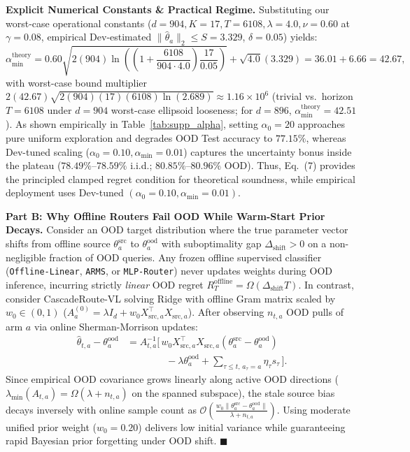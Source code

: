 \documentclass[10pt,twocolumn,letterpaper]{article}
\begin{document}
\textbf{Explicit Numerical Constants \& Practical Regime.} Substituting our worst-case operational constants ($d{=}904, K{=}17, T{=}6108, \lambda{=}4.0, \nu{=}0.60$ at $\gamma{=}0.08$, empirical Dev-estimated $\|\hat{\theta}_a\|_2 \le S{=}3.329$, $\delta{=}0.05$) yields:
\[
\alpha_{\min}^{\text{theory}} = 0.60 \sqrt{2 (904) \ln\!\left(\left(1 + \frac{6108}{904 \cdot 4.0}\right)\frac{17}{0.05}\right)} + \sqrt{4.0}(3.329) = 36.01 + 6.66 = \mathbf{42.67},
\]
with worst-case bound multiplier $2(42.67)\sqrt{2(904)(17)(6108)\ln(2.689)} \approx 1.16\times 10^6$ (trivial vs.\ horizon $T{=}6108$ under $d{=}904$ worst-case ellipsoid looseness; for $d{=}896$, $\alpha_{\min}^{\text{theory}} = 42.51$). As shown empirically in Table~\ref{tab:supp_alpha}, setting $\alpha_0{=}20$ approaches pure uniform exploration and degrades OOD Test accuracy to $77.15\%$, whereas Dev-tuned scaling ($\alpha_0{=}0.10, \alpha_{\min}{=}0.01$) captures the uncertainty bonus inside the plateau ($78.49\%$--$78.59\%$ i.i.d.; $80.85\%$--$80.96\%$ OOD). Thus, Eq.~(7) provides the principled clamped regret condition for theoretical soundness, while empirical deployment uses Dev-tuned $(\alpha_0{=}0.10, \alpha_{\min}{=}0.01)$.

\textbf{Part B: Why Offline Routers Fail OOD While Warm-Start Prior Decays.}
Consider an OOD target distribution where the true parameter vector shifts from offline source $\theta_a^{\text{src}}$ to $\theta_a^{\text{ood}}$ with suboptimality gap $\Delta_{\text{shift}} > 0$ on a non-negligible fraction of OOD queries. Any frozen offline supervised classifier (\texttt{Offline-Linear}, \texttt{ARMS}, or \texttt{MLP-Router}) never updates weights during OOD inference, incurring strictly \emph{linear} OOD regret $R_T^{\text{offline}} = \Omega(\Delta_{\text{shift}} T)$. In contrast, consider CascadeRoute-VL solving Ridge with offline Gram matrix scaled by $w_0 \in (0, 1)$ ($A_a^{(0)} = \lambda I_d + w_0 X_{\text{src},a}^\top X_{\text{src},a}$). After observing $n_{t,a}$ OOD pulls of arm $a$ via online Sherman-Morrison updates:
\begin{align}
\hat{\theta}_{t,a} - \theta_a^{\text{ood}} &= A_{t,a}^{-1}\Big[\, w_0 X_{\text{src},a}^\top X_{\text{src},a} (\theta_a^{\text{src}} - \theta_a^{\text{ood}}) \nonumber\\
&\qquad\qquad - \lambda \theta_a^{\text{ood}} + \!\sum_{\tau \le t,\, a_\tau = a} \eta_\tau s_\tau \,\Big].
\end{align}
Since empirical OOD covariance grows linearly along active OOD directions ($\lambda_{\min}(A_{t,a}) = \Omega(\lambda + n_{t,a})$ on the spanned subspace), the stale source bias decays inversely with online sample count as $\mathcal{O}\!\left(\frac{w_0 \|\theta_a^{\text{src}} - \theta_a^{\text{ood}}\|}{\lambda + n_{t,a}}\right)$. Using moderate unified prior weight ($w_0{=}0.20$) delivers low initial variance while guaranteeing rapid Bayesian prior forgetting under OOD shift. \hfill $\blacksquare$
\end{document}

